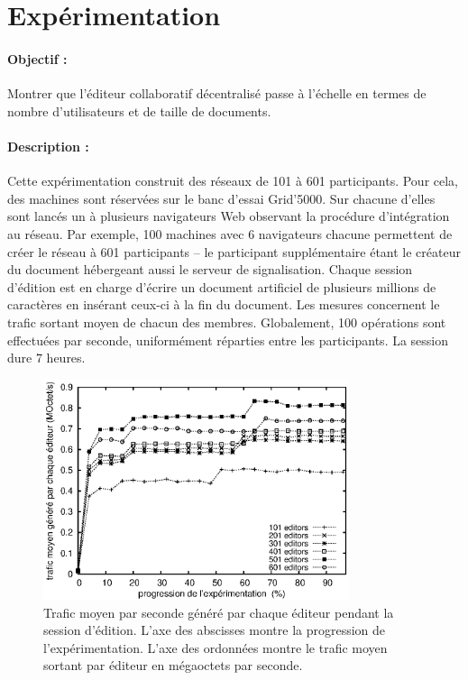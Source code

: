 
\section{Expérimentation}
\label{editor:sec:experimentation}

\paragraph{Objectif :} Montrer que l'éditeur collaboratif décentralisé \CRATE
passe à l'échelle en termes de nombre d'utilisateurs et de taille de
documents.

\paragraph{Description :} Cette expérimentation construit des réseaux de 101 à
601 participants. Pour cela, des machines sont réservées sur le banc d'essai
Grid'5000. Sur chacune d'elles sont lancés un à plusieurs navigateurs Web
observant la procédure d'intégration au réseau. Par exemple, 100 machines avec 6
navigateurs chacune permettent de créer le réseau à 601 participants -- le
participant supplémentaire étant le créateur du document hébergeant aussi le
serveur de signalisation.  Chaque session d'édition est en charge d'écrire un
document artificiel de plusieurs millions de caractères en insérant ceux-ci à la
fin du document. Les mesures concernent le trafic sortant moyen de chacun des
membres. Globalement, 100 opérations sont effectuées par seconde, uniformément
réparties entre les participants. La session dure 7 heures.

\begin{figure}
  \begin{center}
    \includegraphics[width=0.8\textwidth]{img/editor/communication.eps}
    \caption[Trafic généré par \CRATE lors de sessions d'édition]
    {\label{editor:img:communication} Trafic moyen par seconde généré par chaque
      éditeur pendant la session d'édition. L'axe des abscisses montre la
      progression de l'expérimentation. L'axe des ordonnées montre le trafic
      moyen sortant par éditeur en mégaoctets par seconde.}
  \end{center}
\end{figure}

